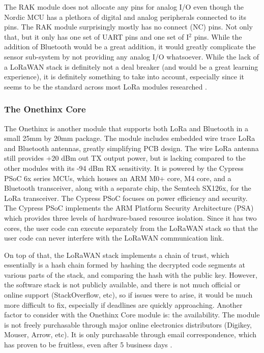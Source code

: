 The RAK module does not allocate any pins for
analog I/O even though the Nordic MCU has a plethora of digital and analog
peripherals connected to its pins. The RAK module surprisingly mostly has no
connect (NC) pins. Not only that, but it only has one set of UART pins and one
set of I$^2$ pins. While the addition of Bluetooth would be a great addition, it
would greatly complicate the sensor sub-system by not providing any analog I/O
whatsoever. While the lack of a LoRaWAN stack is definitely not a deal breaker
(and would be a great learning experience), it is definitely something to take
into account, especially since it seems to be the standard across most LoRa
modules researched \cite{ds-rak4600}.

\subsubsection{The Onethinx Core}
The Onethinx is another module that supports both LoRa and Bluetooth in a small
25mm by 20mm package. The module includes embedded wire trace LoRa and Bluetooth
antennas, greatly simplifying PCB design. The wire LoRa antenna still provides
+20 dBm out TX output power, but is lacking compared to the other modules with
its -94 dBm RX sensitivity. It is powered by the Cypress PSoC 6x series MCUs,
which houses an ARM M0+ core, M4 core, and a Bluetooth transceiver, along with a
separate chip, the Semtech SX126x, for the LoRa transceiver. The Cypress PSoC
focuses on power efficiency and security. The Cypress PSoC implements the ARM
Platform Security Architecture (PSA) which provides three levels of
hardware-based resource isolation. Since it has two cores, the user code can
execute separately from the LoRaWAN stack so that the user code can never
interfere with the LoRaWAN communication link.

On top of that, the LoRaWAN stack
implements a chain of trust, which essentially is a hash chain formed by hashing
the decrypted code segments at various parts of the stack, and comparing the
hash with the public key. However, the software stack is not publicly available,
and there is not much official or online support (StackOverflow, etc), so if
issues were to arise, it would be much more difficult to fix, especially if
deadlines are quickly approaching. Another factor to consider with the Onethinx
Core module is: the availability. The module is not freely purchasable through
major online electronics distributors (Digikey, Mouser, Arrow, etc). It is only
purchasable through email correspondence, which has proven to be fruitless, even
after 5 business days \cite{ds-onethinx}\cite{ds-sx1261}\cite{ds-psoc64bl}.

